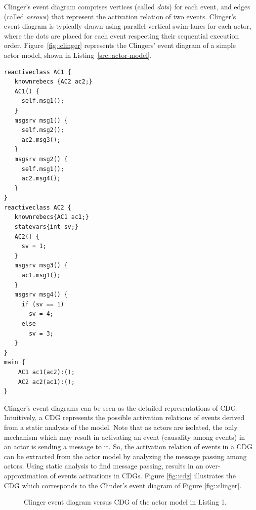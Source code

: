 Clinger's event diagram comprises vertices (called \emph{dots}) for each event, and edges (called \emph{arrows}) that represent the activation relation of two events. Clinger's event diagram is typically drawn using parallel vertical swim-lanes for each actor, where the dots are placed for each event respecting their sequential execution order. Figure~\ref{fig::clinger} represents the Clingers' event diagram of a simple actor model, shown in Listing~\ref{src::actor-model}. 

\begin{lstlisting}[language=rebeca, caption= A simple actor model, label=src::actor-model]
reactiveclass AC1 {
   knownrebecs {AC2 ac2;}
   AC1() {
     self.msg1();
   }
   msgsrv msg1() {
     self.msg2();
     ac2.msg3();
   }
   msgsrv msg2() {
     self.msg1();
     ac2.msg4();
   }
}
reactiveclass AC2 {
   knownrebecs{AC1 ac1;}
   statevars{int sv;}
   AC2() {
     sv = 1;
   }
   msgsrv msg3() {
     ac1.msg1();
   }
   msgsrv msg4() {
     if (sv == 1)
       sv = 4;
     else
       sv = 3;
   }
}
main {
    AC1 ac1(ac2):();
    AC2 ac2(ac1):();
}
\end{lstlisting}

Clinger's event diagrams can be seen as the detailed representations of CDG. Intuitively, a CDG represents the possible activation relations of events derived from a static analysis of the model. Note that as actors are isolated, the only mechanism which may result in activating an event (causality among events) in an actor is sending a message to it. So, the activation relation of events in a CDG can be extracted from the %
actor model by analyzing the message passing among actors. Using static analysis to find message passing, results in an over-approximation of events activations in CDGs. Figure \ref{fig::cdg} illustrates the CDG which corresponds to the Clinder's event diagram of Figure \ref{fig::clinger}.

\begin{figure}
\centering
{}
\qquad
{}
\caption{Clinger event diagram versus CDG of the actor model in Listing 1.}
\label{fig::clinger-cdg}
\end{figure}

